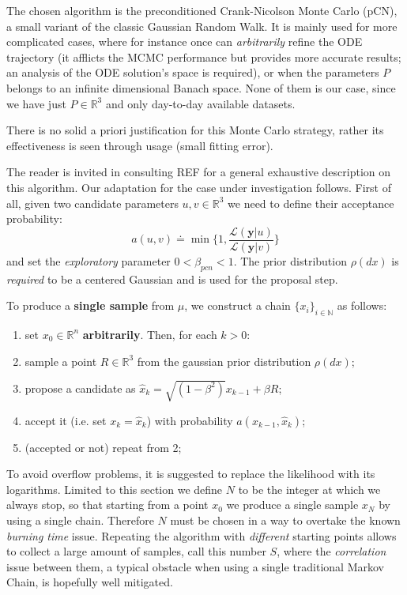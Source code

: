 \documentclass[8pt]{article}
\begin{document}
The chosen algorithm is the preconditioned Crank-Nicolson
Monte Carlo (pCN), a small variant of the classic
Gaussian Random Walk. It is mainly used for more complicated cases,
where for instance once can \emph{arbitrarily} refine the ODE
trajectory (it afflicts the MCMC performance but
provides more accurate results; 
an analysis of the ODE solution's space is required), 
or when the parameters $P$ belongs to 
an infinite dimensional Banach space. 
None of them is our case, since we have just $P \in \mathbb{R}^3$ and
only day-to-day available datasets.


There is no solid a priori justification for this Monte Carlo strategy,
rather its effectiveness is seen through usage (small fitting error).


The reader is invited in consulting REF for a general exhaustive description
on this algorithm. Our adaptation for the case under investigation
follows.
First of all, given two candidate parameters $u, v \in \mathbb{R}^3$ we
need to define their acceptance probability:
\begin{equation}
	a(u, v) \doteq \min \{ 1, \frac{ \mathcal{L}(\textbf{y} | u )}
				{\mathcal{L}(\textbf{y} | v)} \}
\end{equation}
and set the \emph{exploratory} parameter $0 < \beta_{pcn} < 1$. 
The prior distribution $\rho(dx)$ is \emph{required}
to be a centered Gaussian and is used for the proposal step.


To produce a \textbf{single sample} from $\mu$, we construct a chain 
$\{ x_i \} _{i \in \mathbb{N} }$ as follows:

\begin{enumerate}
	\item set $x_0 \in \mathbb{R}^n$ \textbf{arbitrarily}. Then, for each
		$k > 0$:
	\item sample a point $R \in \mathbb{R}^3$ 
		from the gaussian prior distribution $\rho(dx)$;

	\item  propose a candidate as 
		$
		\hat{x}_{k} = \sqrt{(1 - \beta^2)} x_{k-1}
			+ \beta R
		$;
	\item	accept it (i.e. set $x_{k} = \hat{x}_{k}$)
		with probability $a(x_{k-1}, \hat{x}_k)$;
	\item (accepted or not) repeat from 2;
\end{enumerate}

To avoid overflow problems, it is suggested to replace the likelihood with
its logarithms. 
Limited to this section we define
$N$ to be the integer at which we always stop,
so that starting from a point $x_0$ we produce a single sample
$x_N$ by using a single chain. Therefore $N$ must
be chosen in a way to overtake the known \emph{burning time} issue.
Repeating the algorithm with \emph{different} starting points
allows to collect a large amount of samples, call this number $S$,
where the \emph{correlation} issue between them, a typical
obstacle when using a single traditional Markov Chain,
is hopefully well mitigated.
\end{document}
